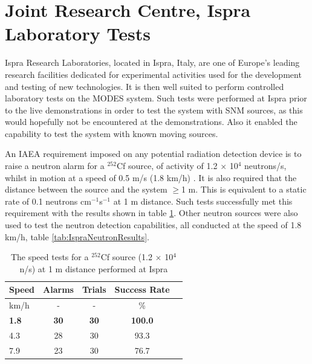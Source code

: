 \section{Joint Research Centre, Ispra Laboratory Tests}
Ispra Research Laboratories, located in Ispra, Italy, are one of Europe's leading research  facilities dedicated for experimental activities used for the development and testing of new technologies. It is then well suited to perform controlled laboratory tests on the MODES system. Such tests were performed at Ispra prior to the live demonstrations in order to test the system with SNM sources, as this would hopefully not be encountered at the demonstrations. Also it enabled the capability to test the system with known moving sources.

An IAEA requirement imposed on any potential radiation detection device is to raise a neutron alarm for a $^{252}$Cf source, of activity of 1.2 $\times$ 10$^{4}$ neutrons/s, whilst in motion at a speed of 0.5 m/s (1.8 km/h) \cite{modesIAEABorder}. It is also required that the distance between the source and the system $\geq$1 m. This is equivalent to a static rate of 0.1 neutrons cm$^{-1}$s$^{-1}$ at 1 m distance. Such tests successfully met this requirement with the results shown in table \ref{tab:IspraCfResults}. Other neutron sources were also used to test the neutron detection capabilities, all conducted at the speed of 1.8 km/h, table \ref{tab:IspraNeutronResults}.

\begin{table}[!htbp]
\begin{center}
	\begin{tabular}{l*{3}{c}r}
	\hline
	 \hline
	 Speed & Alarms & Trials & Success Rate\\
    	\hline
   	km/h & - & - & \% \\
    	\hline
    	\textbf{1.8} & \textbf{30} & \textbf{30} & \textbf{100.0} \\
    	4.3 & 28 & 30 & 93.3 \\
    	7.9 & 23 & 30 & 76.7 \\
    	\hline
    	\hline
  	\end{tabular}
	\caption{The speed tests for a $^{252}$Cf source (1.2 $\times$ 10$^{4}$ n/s) at 1 m distance performed at Ispra}
    	\label{tab:IspraCfResults}
\end{center}
\end{table}

